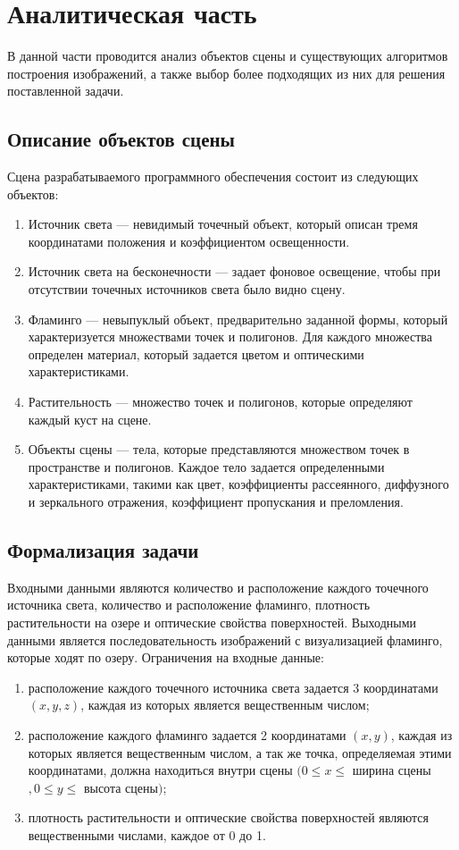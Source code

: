 \chapter{Аналитическая часть}

В данной части проводится анализ объектов сцены и существующих алгоритмов построения изображений, а также выбор более подходящих из них для решения поставленной задачи.

\section{Описание объектов сцены}

Сцена разрабатываемого программного обеспечения состоит из следующих объектов:
\begin{enumerate}[label=\arabic*)]
	\item Источник света --- невидимый точечный объект, который описан тремя координатами положения и коэффициентом освещенности.
	\item Источник света на бесконечности --- задает фоновое освещение, чтобы при отсутствии точечных источников света было видно сцену.
	\item Фламинго --- невыпуклый объект, предварительно заданной формы, который характеризуется множествами точек и полигонов. Для каждого множества определен материал, который задается цветом и оптическими характеристиками.
	\item Растительность --- множество точек и полигонов, которые определяют каждый куст на сцене.
	\item Объекты сцены --- тела, которые представляются множеством точек в пространстве и полигонов. Каждое тело задается определенными характеристиками, такими как цвет, коэффициенты рассеянного, диффузного и зеркального отражения, коэффициент пропускания и преломления.
\end{enumerate} 

\section{Формализация задачи}

Входными данными являются количество и расположение каждого точечного источника света, количество и расположение фламинго, плотность растительности на озере и оптические свойства поверхностей.
Выходными данными является последовательность изображений с визуализацией фламинго, которые ходят по озеру.
Ограничения на входные данные:
\begin{enumerate}[label=\arabic*)]
	\item расположение каждого точечного источника света задается 3 координатами $(x, y, z)$, каждая из которых является вещественным числом;
	\item расположение каждого фламинго задается 2 координатами $(x, y)$, каждая из которых является вещественным числом, а так же точка, определяемая этими координатами, должна находиться внутри сцены $(0 \leq x \leq $ ширина сцены$, 0 \leq y \leq $ высота сцены$)$;
	\item плотность растительности и оптические свойства поверхностей являются вещественными числами, каждое от 0 до 1.
\end{enumerate} 

